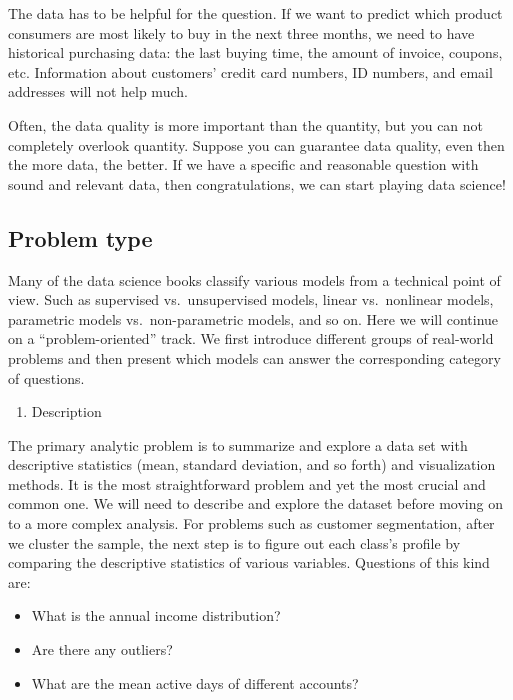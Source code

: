 \documentclass[
  12pt,
]{krantz}
\providecommand{\tightlist}{%
  \setlength{\itemsep}{0pt}\setlength{\parskip}{0pt}}
\begin{document}
The data has to be helpful for the question. If we want to predict which product consumers are most likely to buy in the next three months, we need to have historical purchasing data: the last buying time, the amount of invoice, coupons, etc. Information about customers' credit card numbers, ID numbers, and email addresses will not help much.

Often, the data quality is more important than the quantity, but you can not completely overlook quantity. Suppose you can guarantee data quality, even then the more data, the better. If we have a specific and reasonable question with sound and relevant data, then congratulations, we can start playing data science!

\hypertarget{problem-type}{%
\subsection{Problem type}\label{problem-type}}

Many of the data science books classify various models from a technical point of view. Such as supervised vs.~unsupervised models, linear vs.~nonlinear models, parametric models vs.~non-parametric models, and so on. Here we will continue on a ``problem-oriented'' track. We first introduce different groups of real-world problems and then present which models can answer the corresponding category of questions.

\begin{enumerate}
\def\labelenumi{\arabic{enumi}.}
\tightlist
\item
  Description
\end{enumerate}

The primary analytic problem is to summarize and explore a data set with descriptive statistics (mean, standard deviation, and so forth) and visualization methods. It is the most straightforward problem and yet the most crucial and common one. We will need to describe and explore the dataset before moving on to a more complex analysis. For problems such as customer segmentation, after we cluster the sample, the next step is to figure out each class's profile by comparing the descriptive statistics of various variables. Questions of this kind are:

\begin{itemize}
\tightlist
\item
  What is the annual income distribution?
\item
  Are there any outliers?
\item
  What are the mean active days of different accounts?
\end{itemize}
\end{document}
